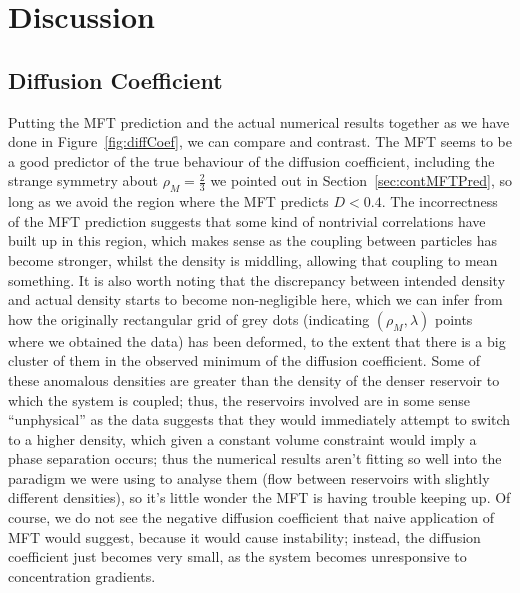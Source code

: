 \section{Discussion} \label{sec:conc}
\subsection{Diffusion Coefficient}
Putting the MFT prediction and the actual numerical results together as we have done in Figure~\ref{fig:diffCoef}, we can compare and contrast. The MFT seems to be a good predictor of the true behaviour of the diffusion coefficient,
including the strange symmetry about $\rho_M=\frac{2}{3}$ we pointed out in Section~\ref{sec:contMFTPred}, so long as we avoid the region where the MFT predicts $D<0.4$. The incorrectness of the MFT prediction suggests that some kind of nontrivial
correlations have built up in this region, which makes sense as the coupling between particles has become stronger, whilst the density is middling, allowing that coupling to mean something. It is also worth noting that the discrepancy between
intended density and actual density starts to become non-negligible here, which we can infer from how the originally rectangular grid of grey dots
(indicating $(\rho_M, \lambda)$ points where we obtained the data) has been deformed, to the extent that there is a big cluster of them in the observed minimum of the diffusion coefficient. Some of these anomalous densities are greater
than the density of the denser reservoir to which the system is coupled; thus, the reservoirs involved are in some sense ``unphysical'' as the data suggests that they would immediately attempt to switch to a higher density, which given a
constant volume constraint would imply a phase separation occurs; thus the numerical results aren't fitting so well into the paradigm we were using to analyse them (flow between reservoirs with slightly different densities),
so it's little wonder the MFT is having trouble keeping up. Of course, we do not see the negative diffusion coefficient that naive application of MFT would suggest, because it would cause instability; instead, the diffusion coefficient just
becomes very small, as the system becomes unresponsive to concentration gradients.

